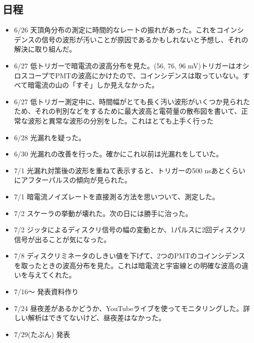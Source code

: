 \documentclass[a4paper,dvipdfmx,titlepage,oneside]{jsarticle}
\numberwithin{equation}{section}
\numberwithin{table}{section}
\numberwithin{figure}{section}
\begin{document}
	\subsection{日程}
		\begin{itemize}
			\item 6/26 天頂角分布の測定に時間的なレートの振れがあった。これをコインシデンスの信号の波形が汚いことが原因であるかもしれないと予想し、それの解決に取り組んだ。
			\item 6/27 低トリガーで暗電流の波高分布を見た。(56, 76, 96 mV)トリガーはオシロスコープでPMTの波高にかけたので、コインシデンスは取っていない。すべて暗電流の山の「すそ」しか見えなかった。
			\item 6/27 低トリガー測定中に、時間幅がとても長く汚い波形がいくつか見られたため、それの判別などをするために最大波高と電荷量の散布図を書いて、正常な波形と異常な波形の分別をした。これはとても上手く行った
			\item 6/28 光漏れを疑った。
			\item 6/30 光漏れの改善を行った。確かにこれ以前は光漏れをしていた。
			\item 7/1 光漏れ対策後の波形を重ねて表示すると、トリガーの500 nsあとくらいにアフターパルスの傾向が見られた。
			\item 7/1 暗電流ノイズレートを直接測る方法を思いついて、測定した。
			\item 7/2 スケーラの挙動が壊れた。次の日には勝手に治った。
			\item 7/2 ジッタによるディスクリ信号の幅の変動とか、1パルスに2回ディスクリ信号が出ることが気になった。
			\item 7/8 ディスクリミネータのしきい値を下げて、2つのPMTのコインシデンスを取ったときの波高分布を見た。これは暗電流と宇宙線との明確な波高の違いを与えてくれた。
			\item 7/16〜 発表資料作り
			\item 7/24 昼夜差があるかどうか、YouTubeライブを使ってモニタリングした。詳しい解析はできてないけど、昼夜差はなかった。
			\item 7/29(たぶん) 発表
		\end{itemize}
\end{document}
